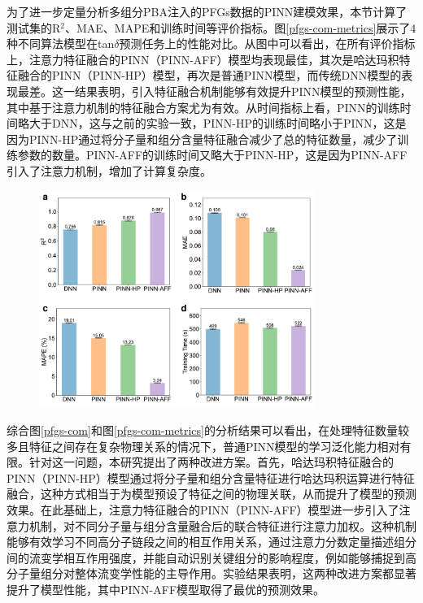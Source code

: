 为了进一步定量分析多组分PBA注入的PFGs数据的PINN建模效果，本节计算了测试集的R$^2$、MAE、MAPE和训练时间等评价指标。图\ref{pfgs-com-metrics}展示了4种不同算法模型在tan$\delta$预测任务上的性能对比。从图中可以看出，在所有评价指标上，注意力特征融合的PINN（PINN-AFF）模型均表现最佳，其次是哈达玛积特征融合的PINN（PINN-HP）模型，再次是普通PINN模型，而传统DNN模型的表现最差。这一结果表明，引入特征融合机制能够有效提升PINN模型的预测性能，其中基于注意力机制的特征融合方案尤为有效。从时间指标上看，PINN的训练时间略大于DNN，这与之前的实验一致，PINN-HP的训练时间略小于PINN，这是因为PINN-HP通过将分子量和组分含量特征融合减少了总的特征数量，减少了训练参数的数量。PINN-AFF的训练时间又略大于PINN-HP，这是因为PINN-AFF引入了注意力机制，增加了计算复杂度。
\begin{figure}[htbp]
  \centering
  \includegraphics[width=0.8\textwidth]{Fig/pfgs-com-metrics.pdf}
\end{figure}

综合图\ref{pfgs-com}和图\ref{pfgs-com-metrics}的分析结果可以看出，在处理特征数量较多且特征之间存在复杂物理关系的情况下，普通PINN模型的学习泛化能力相对有限。针对这一问题，本研究提出了两种改进方案。首先，哈达玛积特征融合的PINN（PINN-HP）模型通过将分子量和组分含量特征进行哈达玛积运算进行特征融合，这种方式相当于为模型预设了特征之间的物理关联，从而提升了模型的预测效果。在此基础上，注意力特征融合的PINN（PINN-AFF）模型进一步引入了注意力机制，对不同分子量与组分含量融合后的联合特征进行注意力加权。这种机制能够有效学习不同高分子链段之间的相互作用关系，通过注意力分数定量描述组分间的流变学相互作用强度，并能自动识别关键组分的影响程度，例如能够捕捉到高分子量组分对整体流变学性能的主导作用。实验结果表明，这两种改进方案都显著提升了模型性能，其中PINN-AFF模型取得了最优的预测效果。

